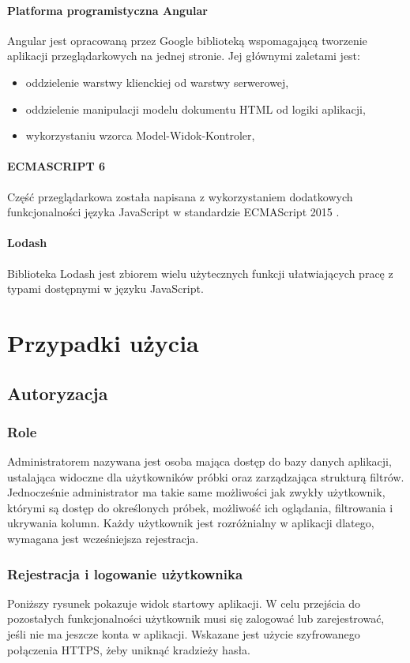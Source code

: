 \documentclass[a4paper,12pt,twoside]{article}
\begin{document}
\paragraph{Platforma programistyczna Angular}
Angular jest opracowaną przez Google biblioteką wspomagającą tworzenie
aplikacji przeglądarkowych na jednej stronie. Jej głównymi zaletami jest:
\begin{itemize}
\item oddzielenie warstwy klienckiej od warstwy serwerowej,
\item oddzielenie manipulacji modelu dokumentu HTML od logiki aplikacji,
\item wykorzystaniu wzorca Model-Widok-Kontroler,
\end{itemize}

\paragraph{ECMASCRIPT 6} Część przeglądarkowa została napisana z wykorzystaniem
dodatkowych funkcjonalności języka JavaScript w standardzie ECMAScript 2015 \cite{ecma}.

\paragraph{Lodash} Biblioteka Lodash \cite{lodash} jest zbiorem wielu użytecznych funkcji ułatwiających pracę z typami dostępnymi w języku JavaScript.

\newpage

\section{Przypadki użycia}
\subsection{Autoryzacja}
\subsubsection{Role}
Administratorem nazywana jest osoba mająca dostęp do bazy danych aplikacji, ustalająca
widoczne dla użytkowników próbki oraz zarządzająca strukturą filtrów.
Jednocześnie administrator ma takie same możliwości jak zwykły użytkownik, którymi są dostęp do określonych próbek, możliwość ich oglądania, filtrowania i ukrywania kolumn.
Każdy użytkownik jest rozróżnialny w aplikacji dlatego, wymagana jest wcześniejsza rejestracja.

\subsubsection{Rejestracja i logowanie użytkownika}
Poniższy rysunek pokazuje widok startowy aplikacji. W celu przejścia do pozostałych funkcjonalności użytkownik musi się zalogować lub zarejestrować, jeśli nie ma jeszcze
konta w aplikacji. Wskazane jest użycie szyfrowanego połączenia HTTPS, żeby uniknąć
kradzieży hasła.
\end{document}
